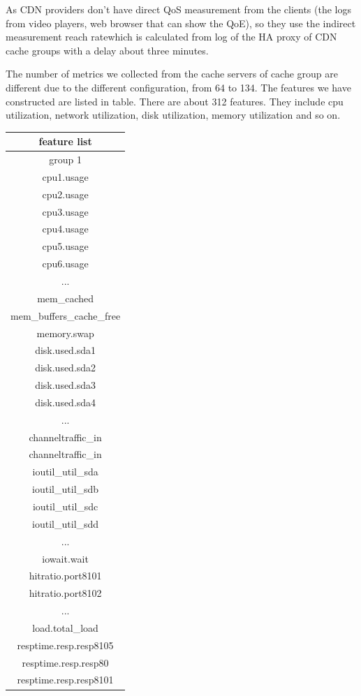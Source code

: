 \documentclass[5p]{elsarticle}
\newcommand{\dabiaolv}{reach rate}
\begin{document}
As CDN providers don't have direct QoS measurement from the clients (the logs from video players, web browser that can show the QoE), so they use the indirect measurement \dabiaolv which is calculated from log of the HA proxy of CDN cache groups with a delay about three minutes. 

The number of metrics we collected from the cache servers of cache group are different due to the different configuration, from 64 to 134. The features we have constructed are listed in table. There are about 312 features. They include cpu utilization, network utilization, disk utilization, memory utilization and so on.

\begin{table}[]
\centering
\begin{tabular}{|c|}
\hline  
feature list\\
\hline  
group 1\\
\hline  
cpu1.usage\\
cpu2.usage\\
cpu3.usage\\
cpu4.usage\\
cpu5.usage\\
cpu6.usage\\
...  \\
mem\_cached\\
mem\_buffers\_cache\_free\\
memory.swap\\ 
disk.used.sda1\\
disk.used.sda2\\
disk.used.sda3\\
disk.used.sda4\\
...\\
channeltraffic\_in\\
channeltraffic\_in\\
ioutil\_util\_sda\\
ioutil\_util\_sdb\\
ioutil\_util\_sdc\\
ioutil\_util\_sdd\\
...\\
iowait.wait\\
hitratio.port8101\\
hitratio.port8102\\
...\\
load.total_load\\
resptime.resp.resp8105\\
resptime.resp.resp80\\
resptime.resp.resp8101\\

\end{tabular}
\end{table}
\end{document}
